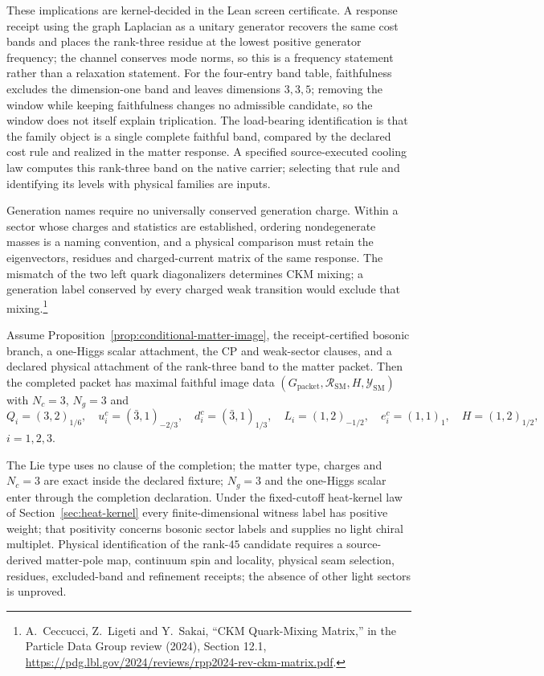 \documentclass[11pt]{article}
\begin{document}
These implications are kernel-decided in the Lean screen certificate. A
response receipt using the graph Laplacian as a unitary generator recovers
the same cost bands and places the rank-three residue at the lowest positive
generator frequency; the channel conserves mode norms, so this is a
frequency statement rather than a relaxation statement. For the four-entry
band table, faithfulness excludes the dimension-one band and leaves
dimensions \(3,3,5\); removing the window while keeping faithfulness changes no
admissible candidate, so the window does not itself explain triplication. The
load-bearing identification is that the family object is a single complete
faithful band, compared by the declared cost rule and realized in the matter
response. A specified source-executed cooling law computes this rank-three
band on the native carrier; selecting that rule and identifying its levels
with physical families are inputs.

Generation names require no universally conserved generation charge. Within
a sector whose charges and statistics are established, ordering nondegenerate
masses is a naming convention, and a physical comparison must retain the
eigenvectors, residues and charged-current matrix of the same response. The
mismatch of the two left quark diagonalizers determines CKM mixing; a
generation label conserved by every charged weak transition would exclude
that mixing.\footnote{A.~Ceccucci, Z.~Ligeti and Y.~Sakai, ``CKM
Quark-Mixing Matrix,'' in the Particle Data Group review (2024), Section
12.1, \url{https://pdg.lbl.gov/2024/reviews/rpp2024-rev-ckm-matrix.pdf}.}

\begin{corollary}
\label{cor:declared-completion}
Assume Proposition~\ref{prop:conditional-matter-image}, the receipt-certified
bosonic branch, a one-Higgs scalar attachment, the CP and weak-sector clauses,
and a declared physical attachment of the rank-three band to the matter
packet. Then the completed packet has maximal faithful image data
\((G_{\mathrm{packet}},\mathcal R_{\mathrm{SM}},H,\mathcal Y_{\mathrm{SM}})\)
with \(N_c=3\), \(N_g=3\) and
\[
Q_i=(3,2)_{1/6},\quad
u_i^c=(\bar 3,1)_{-2/3},\quad
d_i^c=(\bar 3,1)_{1/3},\quad
L_i=(1,2)_{-1/2},\quad
e_i^c=(1,1)_1,\quad
H=(1,2)_{1/2},
\]
\(i=1,2,3\).
\end{corollary}

The Lie type uses no clause of the completion; the matter type, charges and
\(N_c=3\) are exact inside the declared fixture; \(N_g=3\) and the one-Higgs
scalar enter through the completion declaration. Under the fixed-cutoff
heat-kernel law of Section~\ref{sec:heat-kernel} every finite-dimensional
witness label has positive weight; that positivity concerns bosonic sector
labels and supplies no light chiral multiplet. Physical identification of the
rank-\(45\) candidate requires a source-derived matter-pole map, continuum
spin and locality, physical seam selection, residues, excluded-band and
refinement receipts; the absence of other light sectors is unproved.
\end{document}
